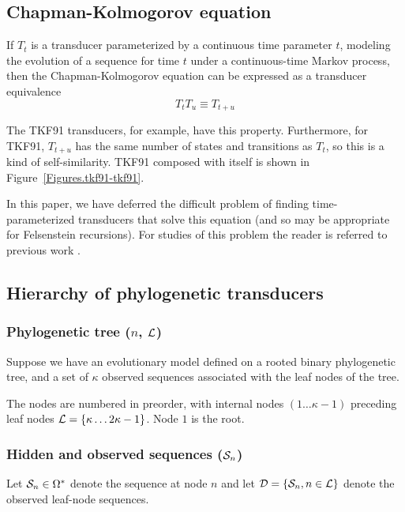 \documentclass{article}
\newcommand{\seclabel}[1]{\label{sec.#1}}
\newcommand{\figref}[1]{Figure~\ref{Figures.#1}}
\newcommand\transequiv{\equiv}
\newcommand\compose{}
\newcommand\numberofleaves{\kappa}
\newcommand\numberofinternalnodes{\numberofleaves - 1}
\newcommand\numberofnodes{2\numberofleaves - 1}
\newcounter{LeafIndex}
\newcommand\leafnode[1]{\numberofleaves \ifthenelse{\equal{#1}{1}}{}{\setcounter{LeafIndex}{#1} \addtocounter{LeafIndex}{-1} +\arabic{LeafIndex}}}
\newcommand\leaves{{\cal L}}
\newcommand\outputs{{\cal D}}
\newcommand\outputn[1]{{\cal S}_{#1}}
\begin{document}
\subsection{Chapman-Kolmogorov equation}
\seclabel{ChapmanKolmogorov}

If $T_t$ is a transducer parameterized by a continuous time parameter $t$,
modeling the evolution of a sequence for time $t$ under a continuous-time Markov process,
then the Chapman-Kolmogorov equation \cite{KarlinTaylor75} can be expressed as a transducer equivalence
\[
T_t \compose T_u \transequiv T_{t+u}
\]

The TKF91 transducers, for example, have this property.
Furthermore, for TKF91, $T_{t+u}$ has the same number of states and transitions as $T_t$,
so this is a kind of self-similarity.
TKF91 composed with itself is shown in \figref{tkf91-tkf91}. 

In this paper, we have deferred the difficult problem of finding time-parameterized transducers that solve this equation
(and so may be appropriate for Felsenstein recursions).
For studies of this problem the reader is referred to previous work \cite{ThorneEtal91,ThorneEtal92,KnudsenMiyamoto2003,MiklosLunterHolmes2004,Rivas05}.

\subsection{Hierarchy of phylogenetic transducers}
\seclabel{ModelStructure}
\subsubsection{Phylogenetic tree ($n$, $\leaves$)}
Suppose we have an evolutionary model defined on a rooted binary phylogenetic tree,
and a set of $\numberofleaves$ observed sequences associated with the leaf nodes of the tree.

The nodes are numbered in preorder, with internal nodes $(1 \ldots \numberofinternalnodes)$ preceding leaf nodes $\leaves = \{ \leafnode{1} \ldots \numberofnodes \}$. Node $1$ is the root.

\subsubsection{Hidden and observed sequences ($\outputn{n}$)}

Let $\outputn{n} \in \Omega^\ast$ denote the sequence at node $n$ and
let $\outputs = \{ \outputn{n}, n \in \leaves \}$ denote the observed leaf-node sequences.
\end{document}
